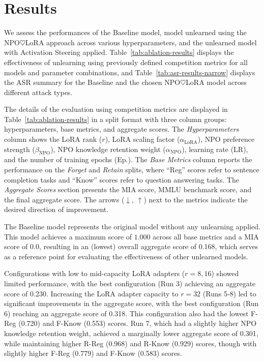 \documentclass[10pt, a4paper]{article}
\begin{document}
\section{Results}
\label{sec:results}
We assess the performances of the Baseline model, model unlearned using the NPO$\heartsuit$LoRA approach across various hyperparameters, and the unlearned model with Activation Steering applied. Table~\ref{tab:ablation-results} displays the effectiveness of unlearning using previously defined competition metrics for all models and parameter combinations, and Table~\ref{tab:asr-results-narrow} displays the ASR summary for the Baseline and the chosen NPO$\heartsuit$LoRA model across different attack types.

The details of the evaluation using competition metrics are displayed in Table~\ref{tab:ablation-results} in a split format with three column groups: hyperparameters, base metrics, and aggregate scores. The \textit{Hyperparameters} column shows the LoRA rank ($r$), LoRA scaling factor ($\alpha_{\text{LoRA}}$), NPO preference strength ($\beta_{\text{NPO}}$), NPO knowledge retention weight ($\alpha_{\text{NPO}}$), learning rate (LR), and the number of training epochs (Ep.). The \textit{Base Metrics} column reports the performance on the \textit{Forget} and \textit{Retain} splits, where ``Reg'' scores refer to sentence completion tasks and ``Know'' scores refer to question answering tasks. The \textit{Aggregate Scores} section presents the MIA score, MMLU benchmark score, and the final aggregate score. The arrows ($\downarrow$, $\uparrow$) next to the metrics indicate the desired direction of improvement.

The Baseline model represents the original model without any unlearning applied. This model achieves a maximum score of $1.000$ across all base metrics and a MIA score of 0.0, resulting in an (lowest) overall aggregate score of 0.168, which serves as a reference point for evaluating the effectiveness of other unlearned models.

Configurations with low to mid-capacity LoRA adapters ($r = 8, 16$) showed limited performance, with the best configuration (Run 3) achieving an aggregate score of 0.230. Increasing the LoRA adapter capacity to $r = 32$ (Runs 5-8) led to significant improvements in the aggregate score, with the best configuration (Run 6) reaching an aggregate score of 0.318. This configuration also had the lowest F-Reg (0.720) and F-Know (0.553) scores. Run 7, which had a slightly higher NPO knowledge retention weight, achieved a marginally lower aggregate score of 0.301, while maintaining higher R-Reg (0.968) and R-Know (0.929) scores, though with slightly higher F-Reg (0.779) and F-Know (0.583) scores.
\end{document}
